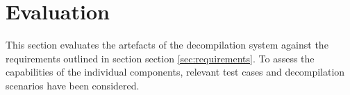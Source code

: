 
%

%
%

\section{Evaluation}
\label{sec:evaluation}

This section evaluates the artefacts of the decompilation system against the requirements outlined in section section \ref{sec:requirements}. To assess the capabilities of the individual components, relevant test cases and decompilation scenarios have been considered.





